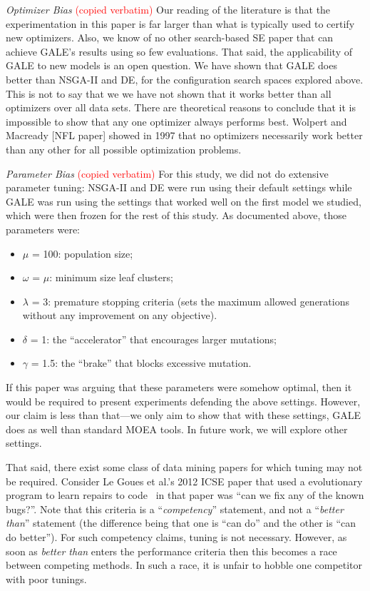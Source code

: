\documentclass{sig-alternative}
\begin{document}
{\em Optimizer Bias} \textcolor{red}{(copied verbatim)}
Our reading of the literature is that the experimentation
in this paper is far larger than what is typically used
to certify new optimizers. Also, we know of no other
search-based SE paper that can achieve GALE’s results
using so few evaluations.
That said, the applicability of GALE to new models
is an open question. We have shown that GALE does
better than NSGA-II and DE, for the configuration search spaces explored
above. This is not to say that we we have not shown that
it works better than all optimizers over all data sets.
There are theoretical reasons to conclude that it is impossible
to show that any one optimizer always performs
best. Wolpert and Macready [NFL paper] showed in 1997 that no
optimizers necessarily work better than any other for all possible optimization problems.

{\em Parameter Bias} \textcolor{red}{(copied verbatim)}
For this study, we did not do extensive parameter tuning:
NSGA-II and DE were run using their default
settings while GALE was run using the settings that
worked well on the first model we studied, which were
then frozen for the rest of this study. As documented
above, those parameters were:
\begin{itemize}
\item $\mu$ = 100: population size;
\item $\omega$ = $\mu$: minimum size leaf clusters;
\item $\lambda$ = 3: premature stopping criteria (sets the maximum
allowed generations without any improvement
on any objective).
\item $\delta$ = 1: the ``accelerator'' that encourages larger
mutations;
\item $\gamma$ = 1.5: the ``brake'' that blocks excessive mutation.
\end{itemize}

If this paper was arguing that these parameters were
somehow optimal, then it would be required to present
experiments defending the above settings. However, our
claim is less than that—we only aim to show that with
these settings, GALE does as well than standard MOEA
tools. In future work, we will explore other settings.




That said, there exist some class of data mining papers for which
tuning may not be required. Consider  Le Goues et al.'s 2012
ICSE paper that used a evolutionary program to learn
repairs to code~
in that paper was ``can we fix any of the known bugs?''. Note
that this criteria is a ``{\em competency}'' statement, and
not a ``{\em better than}'' statement (the difference being that
one is 
``can do'' and the other is ``can do better''). For such
competency claims, tuning is not necessary. However, as soon
as {\em better than} enters the performance criteria then this
becomes a race between competing methods. In such a race,
it is unfair to hobble one competitor with poor tunings.
\end{document}
